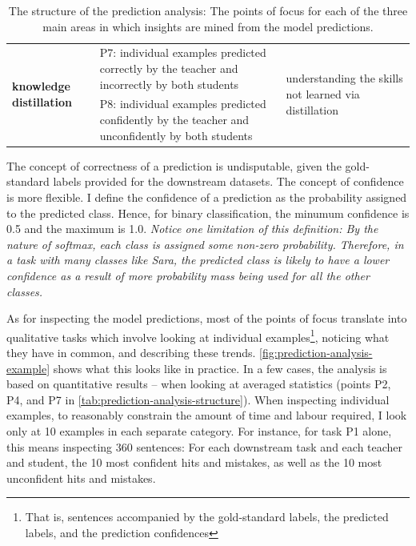 \documentclass[bsc,frontabs,singlespacing,parskip,deptreport]{infthesis}
\begin{document}
{{\begin{table}[h!t]
\begin{tabular}{|m{2.5cm}|m{8.9cm}|m{3.5cm}|}
       \\ \hline
    \multirow{2}{2.5cm}{\textbf{knowledge distillation}} &
      P7: individual examples predicted correctly by the teacher and incorrectly by both students &
      \multirow{2}{3.5cm}{understanding the skills not learned via distillation} \\ \cline{2-2}
     &
      P8: individual examples predicted confidently by the teacher and unconfidently by both students &
   \\ \hline
    \end{tabular}
    \caption{The structure of the prediction analysis: The points of focus for each of the three main areas in which insights are mined from the model predictions.}
    \label{tab:prediction-analysis-structure}
    \end{table}

    The concept of correctness of a prediction is undisputable, given the gold-standard labels provided for the downstream datasets. The concept of confidence is more flexible. I define the confidence of a prediction as the probability assigned to the predicted class. Hence, for binary classification, the minumum confidence is 0.5 and the maximum is 1.0. \textit{Notice one limitation of this definition: By the nature of softmax, each class is assigned some non-zero probability. Therefore, in a task with many classes like Sara, the predicted class is likely to have a lower confidence as a result of more probability mass being used for all the other classes.}

    As for inspecting the model predictions, most of the points of focus translate into qualitative tasks which involve looking at individual examples\footnote{That is, sentences accompanied by the gold-standard labels, the predicted labels, and the prediction confidences}, noticing what they have in common, and describing these trends. \autoref{fig:prediction-analysis-example} shows what this looks like in practice.
    In a few cases, the analysis is based on quantitative results -- when looking at averaged statistics (points P2, P4, and P7 in \autoref{tab:prediction-analysis-structure}).
    When inspecting individual examples, to reasonably constrain the amount of time and labour required, I look only at 10 examples in each separate category. For instance, for task P1 alone, this means inspecting 360 sentences: For each downstream task and each teacher and student, the 10 most confident hits and mistakes, as well as the 10 most unconfident hits and mistakes.

}}
\end{document}
